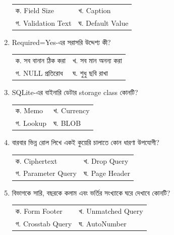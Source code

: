 \begin{multicols}{2}
\begin{enumerate}[resume]
\begin{minipage}[t]{\linewidth}
\begin{tabularx}{\linewidth}{@{}X X@{}}
ক. Field Size & খ. Caption \\
গ. Validation Text & ঘ. Default Value \\
\end{tabularx}
\end{minipage}
\vspace{1pt}
\item \begin{minipage}[t]{\linewidth}
Required=Yes-এর সরাসরি উদ্দেশ্য কী?
\par
\begin{tabularx}{\linewidth}{@{}X X@{}}
ক. সব বানান ঠিক করা & খ. সব মান অনন্য করা \\
গ. NULL প্রতিরোধ & ঘ. শুধু ছবি রাখা \\
\end{tabularx}
\end{minipage}
\vspace{1pt}
\item \begin{minipage}[t]{\linewidth}
SQLite-এর বাইনারি ডেটার storage class কোনটি?
\par
\begin{tabularx}{\linewidth}{@{}X X@{}}
ক. Memo & খ. Currency \\
গ. Lookup & ঘ. BLOB \\
\end{tabularx}
\end{minipage}
\vspace{1pt}
\item \begin{minipage}[t]{\linewidth}
বারবার ভিন্ন রোল লিখে একই কুয়েরি চালাতে কোন ধারণা উপযোগী?
\par
\begin{tabularx}{\linewidth}{@{}X X@{}}
ক. Ciphertext & খ. Drop Query \\
গ. Parameter Query & ঘ. Page Header \\
\end{tabularx}
\end{minipage}
\vspace{1pt}
\item \begin{minipage}[t]{\linewidth}
বিভাগকে সারি, বছরকে কলাম এবং ভর্তির সংখ্যাকে ঘরে দেখাবে কোনটি?
\par
\begin{tabularx}{\linewidth}{@{}X X@{}}
ক. Form Footer & খ. Unmatched Query \\
গ. Crosstab Query & ঘ. AutoNumber \\
\end{tabularx}

\end{minipage}
\end{enumerate}
\end{multicols}
